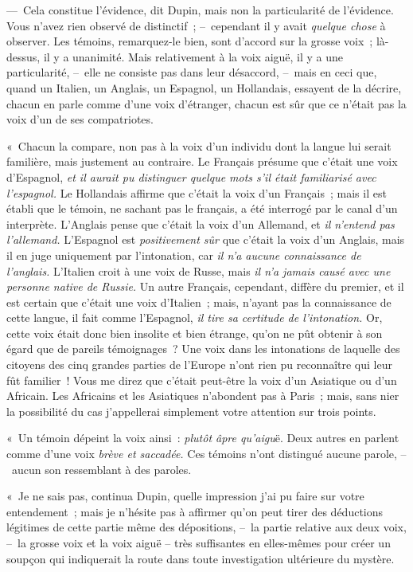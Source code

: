 \documentclass[french,twoside]{book} %
\begin{document}
— Cela constitue l’évidence, dit Dupin, mais non la particularité de l’évidence. Vous n’avez rien observé de distinctif ; – cependant il y avait \emph{quelque chose} à observer. Les témoins, remarquez-le bien, sont d’accord sur la grosse voix ; là-dessus, il y a unanimité. Mais relativement à la voix aiguë, il y a une particularité, – elle ne consiste pas dans leur désaccord, – mais en ceci que, quand un Italien, un Anglais, un Espagnol, un Hollandais, essayent de la décrire, chacun en parle comme d’une voix d’étranger, chacun est sûr que ce n’était pas la voix d’un de ses compatriotes.\par
« Chacun la compare, non pas à la voix d’un individu dont la langue lui serait familière, mais justement au contraire. Le Français présume que c’était une voix d’Espagnol, \emph{et il aurait pu distinguer quelque mots s’il était familiarisé avec l’espagnol.} Le Hollandais affirme que c’était la voix d’un Français ; mais il est établi que le témoin, ne sachant pas le français, a été interrogé par le canal d’un interprète. L’Anglais pense que c’était la voix d’un Allemand, et \emph{il n’entend pas l’allemand.} L’Espagnol est \emph{positivement sûr} que c’était la voix d’un Anglais, mais il en juge uniquement par l’intonation, car \emph{il n’a aucune connaissance de l’anglais.} L’Italien croit à une voix de Russe, mais \emph{il n’a jamais causé avec une personne native de Russie.} Un autre Français, cependant, diffère du premier, et il est certain que c’était une voix d’Italien ; mais, n’ayant pas la connaissance de cette langue, il fait comme l’Espagnol,\emph{ il tire sa certitude de l’intonation.} Or, cette voix était donc bien insolite et bien étrange, qu’on ne pût obtenir à son égard que de pareils témoignages ? Une voix dans les intonations de laquelle des citoyens des cinq grandes parties de l’Europe n’ont rien pu reconnaître qui leur fût familier ! Vous me direz que c’était peut-être la voix d’un Asiatique ou d’un Africain. Les Africains et les Asiatiques n’abondent pas à Paris ; mais, sans nier la possibilité du cas j’appellerai simplement votre attention sur trois points.\par
« Un témoin dépeint la voix ainsi : \emph{plutôt âpre qu’aigu}ë. Deux autres en parlent comme d’une voix \emph{brève et saccadée.} Ces témoins n’ont distingué aucune parole, – aucun son ressemblant à des paroles.\par
« Je ne sais pas, continua Dupin, quelle impression j’ai pu faire sur votre entendement ; mais je n’hésite pas à affirmer qu’on peut tirer des déductions légitimes de cette partie même des dépositions, – la partie relative aux deux voix, – la grosse voix et la voix aiguë – très suffisantes en elles-mêmes pour créer un soupçon qui indiquerait la route dans toute investigation ultérieure du mystère.\par
\end{document}
